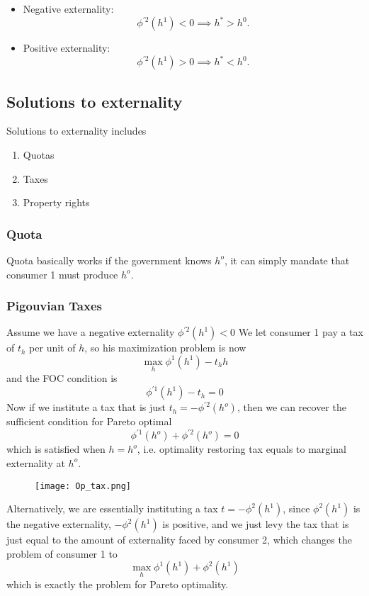 \documentclass[twocolumn, fleqn]{article}
\begin{document}
		\begin{itemize}
    	\item Negative externality:
    	\[
    	\phi^{\prime2}(h^1) < 0 \implies h^* > h^0.
    	\]
    	\item Positive externality:
    	\[
    	\phi^{\prime2}(h^1) > 0 \implies h^* < h^0.
    	\]
		\end{itemize}

		\subsection{Solutions to externality}
		Solutions to externality includes 
		\begin{enumerate}
			\item Quotas
			\item Taxes
			\item Property rights
		\end{enumerate}
		
		\subsubsection{Quota}
		Quota basically works if the government knows $h^o$, it can simply mandate that consumer 1 must produce $h^o$.
		
		\subsubsection{Pigouvian Taxes}
		Assume we have a negative externality $\phi^{\prime2}(h^1) < 0$
		We let consumer 1 pay a tax of $t_h$ per unit of $h$, so his maximization problem is now
		\[ \max_h \phi^1 (h^1) - t_h h\]
		and the FOC condition is 
		\[ \phi^{\prime 1} (h^1) - t_h =0\]
		Now if we institute a tax that is just $t_h = -\phi^{\prime 2}(h^o)$, then we can recover the sufficient condition for Pareto optimal
		\[\phi^{\prime 1}(h^o) + \phi^{\prime 2}(h^o)=0\]
		which is satisfied when $h= h^o$, i.e. optimality restoring tax equals to marginal externality at $h^o$.
		
		\begin{figure}[h]
			\center
			\texttt{[image: Op\_tax.png]}
		\end{figure}
		
		Alternatively, we are essentially instituting a tax $t = -\phi^2(h^1)$, since $\phi^2(h^1)$ is the negative externality, $-\phi^2(h^1)$ is positive, and we just levy the tax that is just equal to the amount of externality faced by consumer 2, which changes the problem of consumer 1 to 
		\[ \max_h \phi^1 (h^1) +\phi^2(h^1)\]
		which is exactly the problem for Pareto optimality.
		\vspace{4pt}
		
\end{document}
